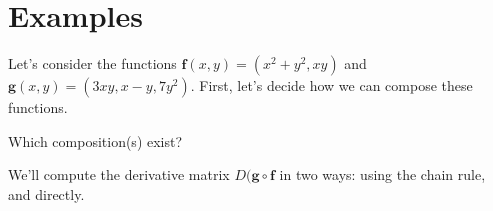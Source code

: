 \documentclass{ximera}
\begin{document}
\section*{Examples}

\begin{example}
Let's consider the functions $\mathbf{f}(x,y) = (x^2+y^2, xy)$ and $\mathbf{g}(x,y) = (3xy, x-y, 7y^2)$. First, let's decide how we can compose these functions.

Which composition(s) exist?
\begin{multipleChoice}
\end{multipleChoice}

We'll compute the derivative matrix $D(\mathbf{g}\circ\mathbf{f}$ in two ways: using the chain rule, and directly.


\end{example}
\end{document}
